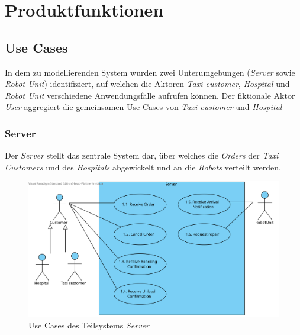 \section{Produktfunktionen}

		\subsection{Use Cases}
		
		In dem zu modellierenden System wurden zwei Unterumgebungen (\emph{Server} sowie \emph{Robot Unit}) identifiziert, auf welchen die Aktoren \emph{Taxi customer}, \emph{Hospital} und \emph{Robot Unit} verschiedene Anwendungsfälle aufrufen können. Der fiktionale Aktor \emph{User} aggregiert die gemeinsamen Use-Cases von \emph{Taxi customer} und \emph{Hospital} \\
			\subsubsection{Server}
			Der \emph{Server} stellt das zentrale System dar, über welches die \emph{Orders} der \emph{Taxi Customers} und des \emph{Hospitals} abgewickelt und an die \emph{Robots} verteilt werden.
				\begin{figure}[H]
					\centering
					\includegraphics[width=1.0\textwidth]{img/2-Analyse-Server}
					\caption{Use Cases des Teilsystems \emph{Server}}
					\label{fig:3-1-server-use-cases}
				\end{figure}
			\pagebreak

